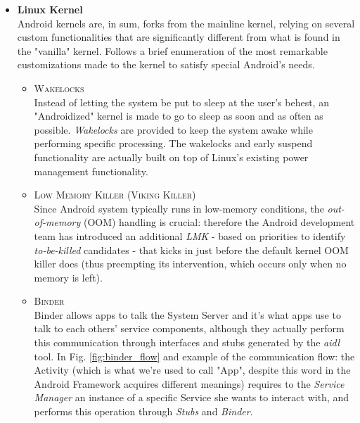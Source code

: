\begin{itemize}
\item \textbf{Linux Kernel}\\
Android kernels are, in sum, forks from the mainline kernel, relying on several custom 	functionalities that are significantly different from what is found in the "vanilla" kernel. Follows a brief enumeration of the most remarkable customizations made to the kernel to satisfy special Android's needs.
	\begin{itemize}
	\item \textsc{Wakelocks}\\
	Instead of letting the system be put to sleep at the user's behest, an "Androidized"
kernel is made to go to sleep as soon and as often as possible. \textit{Wakelocks} are provided to keep the system awake while performing specific processing. The wakelocks and early suspend functionality are actually built on top of Linux's existing power management functionality.
	\item \textsc{Low Memory Killer (Viking Killer)}\\
	Since Android system typically runs in low-memory conditions, the \textit{out-of-memory} (OOM) handling is crucial: therefore the Android development team has introduced an additional \textit{LMK} - based on priorities to identify \textit{to-be-killed} candidates - that kicks in just before the default kernel OOM killer does (thus preempting its intervention, which occurs only when no memory is left).
	\item \textsc{Binder}\\
	Binder allows apps to talk the System Server and it's what apps use to talk to each others' service components, although they actually perform this communication through  interfaces and stubs generated by the \textit{aidl} tool. In Fig. \ref{fig:binder_flow} and example of the communication flow: the Activity (which is what we're used to call "App", despite this word in the Android Framework acquires different meanings) requires to the \textit{Service Manager} an instance of a specific Service she wants to interact with, and performs this operation through \textit{Stubs} and \textit{Binder}.
		\begin{figure}[!htb]
			\centering

\end{figure}
\end{itemize}
\end{itemize}
